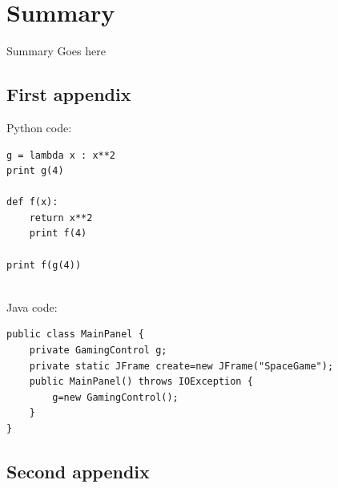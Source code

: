 \documentclass[11pt]{article}
\begin{document}
\section{Summary}

	Summary Goes here

\clearpage
\begin{center}


\end{center}

\begin{appendices} %
    
    \clearpage
    \begin{center}
	\section{First appendix}
    \end{center}

    Python code:
    \lstset{language=Python} %
    \begin{lstlisting}
g = lambda x : x**2
print g(4)

def f(x):
    return x**2
    print f(4)

print f(g(4))
    \end{lstlisting}
    ~\\

Java code:
    \lstset{language=Java} %
    \begin{lstlisting}
public class MainPanel {
    private GamingControl g;
    private static JFrame create=new JFrame("SpaceGame");
    public MainPanel() throws IOException {
        g=new GamingControl();
    }
}
    \end{lstlisting}

    \clearpage
    \begin{center}
	\section{Second appendix}
    \end{center}

        	         	

        	
%        	
%
        	
        	

\end{appendices}
\end{document}
